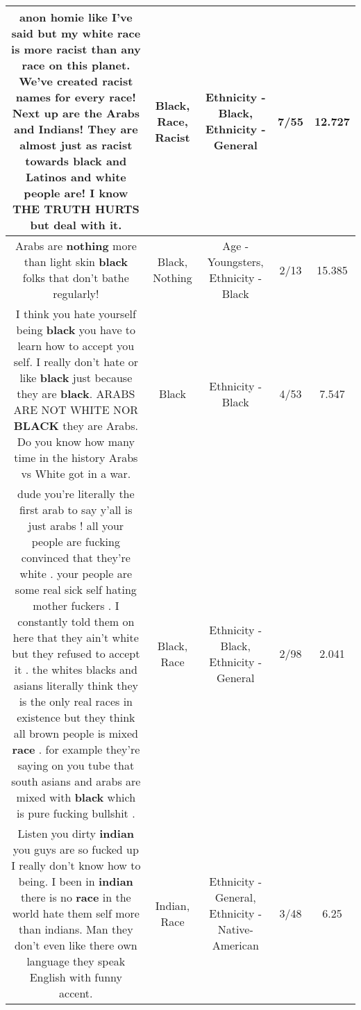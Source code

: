\documentclass[11pt]{article}
\newlength\mylength
\begin{document}
\begin{center}
\begin{longtable}{|C{.65\mylength}|C{.30\mylength}|C{.12\mylength}|C{.12\mylength}|C{.12\mylength}|}
  \small anon homie like I've said but my white \textbf{race} is more \textbf{racist} than any \textbf{race} on this planet.   We've created \textbf{racist} names for every \textbf{race}!  Next up are the Arabs and Indians!  They are almost just as \textbf{racist} towards \textbf{black} and Latinos and white people are! I know THE TRUTH HURTS but deal with it.\normalsize   & Black, Race, Racist & Ethnicity - Black, Ethnicity - General & 7/55 & 12.727 \\  \hline
  \small Arabs are \textbf{nothing} more than light skin \textbf{black} folks that don't bathe regularly!\normalsize   & Black, Nothing & Age - Youngsters, Ethnicity - Black & 2/13 & 15.385 \\  \hline
  \small I think you hate yourself being \textbf{black} you have to learn how to accept you self. I really don't hate or like \textbf{black} just because they are \textbf{black}. ARABS ARE NOT WHITE NOR \textbf{BLACK} they are Arabs. Do you know how many time in the history Arabs vs White got in a war.\normalsize   & Black & Ethnicity - Black & 4/53 & 7.547 \\  \hline
  \small dude you're literally the first arab to say y'all is just arabs ! all your people are fucking convinced that they're white . your people are some real sick self hating mother fuckers . I constantly told them on here that they ain't white but they refused to accept it . the whites  blacks and asians  literally think they is the only real races in existence but they think all brown  people is mixed \textbf{race} . for example they're saying on you tube that south asians and arabs are mixed with \textbf{black} which is pure fucking bullshit .\normalsize   & Black, Race & Ethnicity - Black, Ethnicity - General & 2/98 & 2.041 \\  \hline
  \small Listen you dirty \textbf{indian} you guys are so fucked up I really don't know how to being. I been in \textbf{indian} there is no \textbf{race} in the world hate them self more than indians. Man they don't even like there own language they speak English with funny accent.\normalsize   & Indian, Race & Ethnicity - General, Ethnicity - Native-American & 3/48 & 6.25 \\  \hline

\end{longtable}
\end{center}
\end{document}
